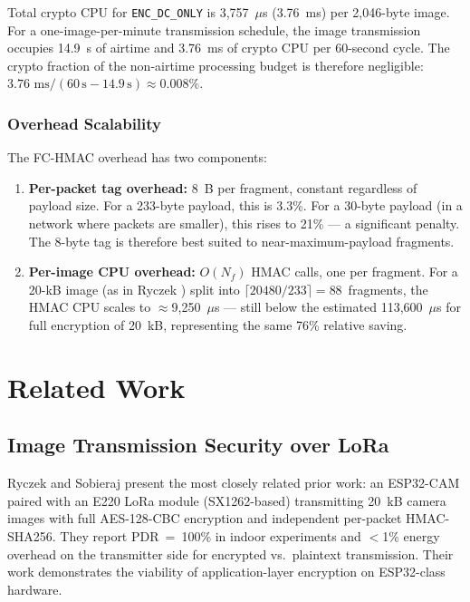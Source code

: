 \documentclass[journal]{IEEEtran}
\begin{document}
Total crypto CPU for \texttt{ENC\_DC\_ONLY} is 3{,}757~$\mu$s (3.76~ms) per
2{,}046-byte image.  For a one-image-per-minute transmission schedule, the image
transmission occupies 14.9~s of airtime and 3.76~ms of crypto CPU per 60-second
cycle.  The crypto fraction of the non-airtime processing budget is therefore
negligible: $3.76 \text{ ms} / (60\,\text{s} - 14.9\,\text{s}) \approx 0.008\%$.

\subsubsection{Overhead Scalability}

The FC-HMAC overhead has two components:
\begin{enumerate}
  \item \textbf{Per-packet tag overhead:} 8~B per fragment, constant regardless
    of payload size.  For a 233-byte payload, this is 3.3\%.  For a
    30-byte payload (in a network where packets are smaller), this rises to
    21\% --- a significant penalty.  The 8-byte tag is therefore best suited
    to near-maximum-payload fragments.
  \item \textbf{Per-image CPU overhead:} $O(N_f)$ HMAC calls, one per fragment.
    For a 20-kB image (as in Ryczek \cite{ryczek2025}) split into
    $\lceil 20480 / 233 \rceil = 88$~fragments, the HMAC CPU scales to
    $\approx$9{,}250~$\mu$s --- still below the estimated 113{,}600~$\mu$s for
    full encryption of 20~kB, representing the same 76\% relative saving.
\end{enumerate}

\section{Related Work}
\label{sec:related}

\subsection{Image Transmission Security over LoRa}

Ryczek and Sobieraj \cite{ryczek2025} present the most closely related prior
work: an ESP32-CAM paired with an E220 LoRa module (SX1262-based) transmitting
20~kB camera images with full AES-128-CBC encryption and independent
per-packet HMAC-SHA256.  They report PDR~=~100\% in indoor experiments and
$<$1\% energy overhead on the transmitter side for encrypted vs.\ plaintext
transmission.  Their work demonstrates the viability of application-layer
encryption on ESP32-class hardware.
\end{document}
